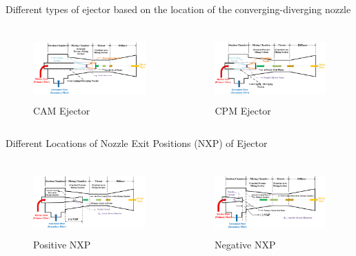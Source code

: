 \begin{frame}{Different types of ejector based on the location of the converging-diverging nozzle\cite{huang1985ejector}}
  \begin{columns}
    \begin{figure}[h]
      \centering
      \includegraphics[height=2.5cm]{images/CAM ejector.PNG}
      \caption{CAM Ejector}
   \end{figure}
    \begin{figure}[h]
    \centering
    \includegraphics[height=2.5cm]{images/CPM ejector.PNG}
    \caption{CPM Ejector}
    \end{figure}
  \end{columns}
\end{frame}

\begin{frame}{Different Locations of Nozzle Exit Positions (NXP) of Ejector\cite{eames1999experimental,eames2007results,kumar2019effect,wang2017numerical, ramesh2018experimental, meyer2009steam}}
\begin{columns}
    \begin{figure}
        \centering
        \includegraphics[height=2.5cm]{images/NXP+.PNG}
        \caption{\centering Positive NXP}
        \label{fig:nxppositive}
    \end{figure}
    \begin{figure}
        \centering
        \includegraphics[height=2.5cm]{images/NXP-.PNG}
        \caption{\centering Negative NXP}
        \label{fig:nxpnegative}
    \end{figure}
\end{columns}
\end{frame}

